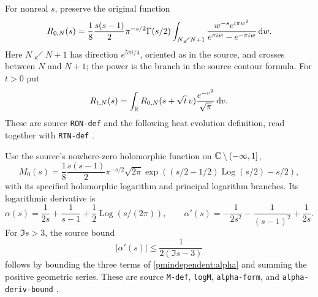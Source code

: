 For nonreal $s$, preserve the original function
\begin{equation}\label{pmindependent:defR}
 R_{0,N}(s)=\frac18\frac{s(s-1)}2\pi^{-s/2}\Gamma(s/2)
 \int_{N\swarrow N+1}
 \frac{w^{-s}e^{i\pi w^2}}{e^{\pi iw}-e^{-\pi iw}}\,\mathrm d w.
\end{equation}
Here $N\swarrow N+1$ has direction $e^{5\pi i/4}$, oriented as
in the source, and crosses between $N$ and $N+1$; the power is
the branch in the source contour formula. For $t>0$ put
\begin{equation}\label{pmindependent:heatR}
 R_{t,N}(s)=\int_\mathbb R R_{0,N}(s+\sqrt t\,v)
                      \frac{e^{-v^2}}{\sqrt\pi}\,\mathrm d v.
\end{equation}
These are source \texttt{RON-def} and the following heat evolution
definition, read together with \texttt{RTN-def} \cite{pmindependent:polymath}.

Use the source's nowhere-zero holomorphic function on
$\mathbb C\setminus(-\infty,1]$,
\begin{equation}\label{pmindependent:defM}
 M_0(s)=\frac18\frac{s(s-1)}2\pi^{-s/2}\sqrt{2\pi}
 \exp\!\left((s/2-1/2)\operatorname{Log}(s/2)-s/2\right),
\end{equation}
with its specified holomorphic logarithm and principal logarithm
branches. Its logarithmic derivative is
\begin{equation}\label{pmindependent:alpha}
 \alpha(s)=\frac1{2s}+\frac1{s-1}+\frac12\operatorname{Log}(s/(2\pi)),
 \qquad
 \alpha'(s)=-\frac1{2s^2}-\frac1{(s-1)^2}+\frac1{2s}.
\end{equation}
For $\Im s>3$, the source bound
\begin{equation}\label{pmindependent:alphabound}
 |\alpha'(s)|\le\frac1{2(\Im s-3)}
\end{equation}
follows by bounding the three terms of \eqref{pmindependent:alpha} and summing
the positive geometric series. These are source \texttt{M-def},
\texttt{logM}, \texttt{alpha-form}, and
\texttt{alpha-deriv-bound} \cite{pmindependent:polymath}.

